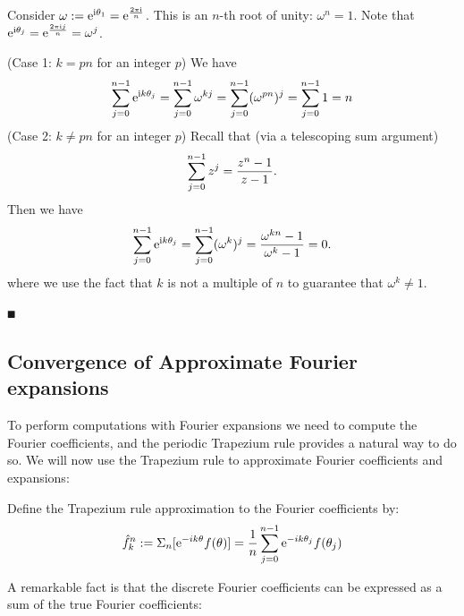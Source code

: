 Consider $\omega := {\rm e}^{{\rm i} \theta_1} = {\rm e}^{2 \pi {\rm i} \over n}$. This is an $n$-th root of unity: $\ensuremath{\omega}^n = 1$. Note that ${\rm e}^{{\rm i} \theta_j} ={\rm e}^{2 \pi {\rm i} j \over n}= \omega^j$.

(Case 1: $k = pn$ for an integer $p$) We have
\[
\sum_{j=0}^{n-1} {\rm e}^{{\rm i} k \theta_j} = \sum_{j=0}^{n-1} \omega^{kj} = \sum_{j=0}^{n-1} ({\omega^{pn}})^j =   \sum_{j=0}^{n-1} 1 = n
\]
(Case 2: $k \ensuremath{\neq} pn$ for an integer $p$)  Recall that (via a telescoping sum argument)
\[
\ensuremath{\sum}_{j=0}^{n-1} z^j = {z^n-1 \over z-1}.
\]
Then we have
\[
\sum_{j=0}^{n-1} {\rm e}^{{\rm i} k \theta_j} = \sum_{j=0}^{n-1} (\omega^k)^j = {\omega^{kn} -1 \over \omega^k -1} = 0.
\]
where we use the fact that $k$ is not a multiple of $n$ to guarantee that $\ensuremath{\omega}^k \ensuremath{\neq} 1$.

\ensuremath{\QED}

\subsection{Convergence of Approximate Fourier expansions}
To perform computations with Fourier expansions we need to compute the Fourier coefficients, and the periodic Trapezium rule provides a natural way to do so. We will now use the Trapezium rule to approximate Fourier coefficients and expansions:

\begin{definition} Define the Trapezium rule approximation to the Fourier coefficients by:
\[
\hat f_k^n := \Sigma_n[{\rm e}^{-i k \theta} f(\theta)]  = {1 \over n} \sum_{j=0}^{n-1} {\rm e}^{-i k \theta_j} f(\theta_j)
\]
\end{definition}

A remarkable fact is that the discrete Fourier coefficients can be expressed as a sum of the true Fourier coefficients:

